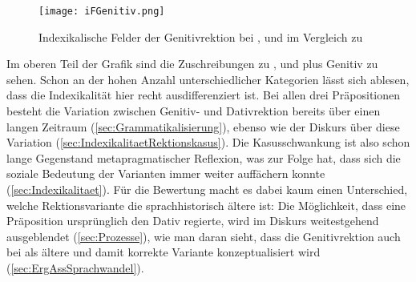 \begin{figure}[hp]
\texttt{[image: iFGenitiv.png]}
\caption{Indexikalische Felder der Genitivrektion bei \wegen, \waehrend{} und \dank{} im Vergleich zu \gegenueber}
\label{pic:iFGenitiv}
\end{figure}

\newpage Im oberen Teil der Grafik sind die Zuschreibungen zu \wegen, \waehrend{} und \dank{} plus Genitiv zu sehen. 
Schon an der hohen Anzahl unterschiedlicher Kategorien lässt sich ablesen, dass die Indexikalität hier recht ausdifferenziert ist. 
Bei allen drei Präpositionen besteht die Variation zwischen Genitiv- und Dativrektion bereits über einen langen Zeitraum (\autoref{sec:Grammatikalisierung}), ebenso wie der Diskurs über diese Variation (\autoref{sec:IndexikalitaetRektionskasus}).
Die Kasusschwankung ist also schon lange Gegenstand metapragmatischer Reflexion, was zur Folge hat, dass sich die soziale Bedeutung der Varianten immer weiter auffächern konnte (\autoref{sec:Indexikalitaet}). 
Für die Bewertung macht es dabei kaum einen Unterschied, welche Rektionsvariante die sprachhistorisch ältere ist: 
Die Möglichkeit, dass eine Präposition ursprünglich den Dativ regierte, wird im Diskurs weitestgehend ausgeblendet (\autoref{sec:Prozesse}), wie man daran sieht, dass die Genitivrektion auch bei \dank{} als ältere und damit korrekte Variante konzeptualisiert wird (\autoref{sec:ErgAssSprachwandel}). 

